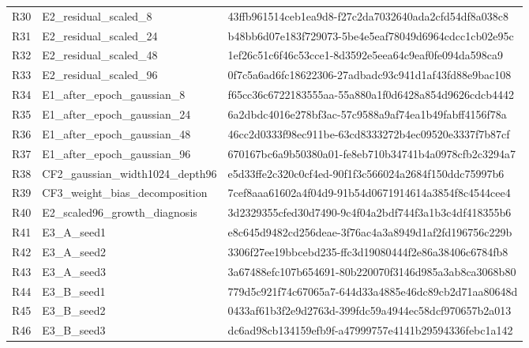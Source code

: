 \documentclass[10pt,a4paper]{article}
\begin{document}
{\begin{longtable}{p{7mm}p{43mm}p{103mm}}
R30 & E2\_residual\_scaled\_8 & {\ttfamily 43ffb961514ceb1ea9d8-f27c2da7032640ada2cfd54df8a038c8} \\

R31 & E2\_residual\_scaled\_24 & {\ttfamily b48bb6d07e183f729073-5be4e5eaf78049d6964cdcc1cb02e95c} \\

R32 & E2\_residual\_scaled\_48 & {\ttfamily 1ef26c51c6f46c53cce1-8d3592e5eea64c9eaf0fe094da598ca9} \\

R33 & E2\_residual\_scaled\_96 & {\ttfamily 0f7c5a6ad6fc18622306-27adbadc93c941d1af43fd88e9bac108} \\

R34 & E1\_after\_epoch\_gaussian\_8 & {\ttfamily f65cc36c6722183555aa-55a880a1f0d6428a854d9626cdcb4442} \\

R35 & E1\_after\_epoch\_gaussian\_24 & {\ttfamily 6a2dbdc4016e278bf3ac-57c9588a9af74ea1b49fabff4156f78a} \\

R36 & E1\_after\_epoch\_gaussian\_48 & {\ttfamily 46cc2d0333f98ec911be-63cd8333272b4ec09520e3337f7b87cf} \\

R37 & E1\_after\_epoch\_gaussian\_96 & {\ttfamily 670167bc6a9b50380a01-fe8eb710b34741b4a0978cfb2c3294a7} \\

R38 & CF2\_gaussian\_width1024\_depth96 & {\ttfamily e5d33ffe2c320c0cf4ed-90f1f3c566024a2684f150ddc75997b6} \\

R39 & CF3\_weight\_bias\_decomposition & {\ttfamily 7cef8aaa61602a4f04d9-91b54d0671914614a3854f8c4544cee4} \\

R40 & E2\_scaled96\_growth\_diagnosis & {\ttfamily 3d2329355cfed30d7490-9c4f04a2bdf744f3a1b3c4df418355b6} \\

R41 & E3\_A\_seed1 & {\ttfamily e8c645d9482cd256deae-3f76ac4a3a8949d1af2fd196756c229b} \\

R42 & E3\_A\_seed2 & {\ttfamily 3306f27ee19bbcebd235-ffc3d19080444f2e86a38406c6784fb8} \\

R43 & E3\_A\_seed3 & {\ttfamily 3a67488efc107b654691-80b220070f3146d985a3ab8ca3068b80} \\

R44 & E3\_B\_seed1 & {\ttfamily 779d5c921f74c67065a7-644d33a4885e46dc89cb2d71aa80648d} \\

R45 & E3\_B\_seed2 & {\ttfamily 0433af61b3f2e9d2763d-399fdc59a4944ec58dcf970657b2a013} \\

R46 & E3\_B\_seed3 & {\ttfamily dc6ad98cb134159efb9f-a47999757e4141b29594336febc1a142} \\

\bottomrule\end{longtable}}
\end{document}
